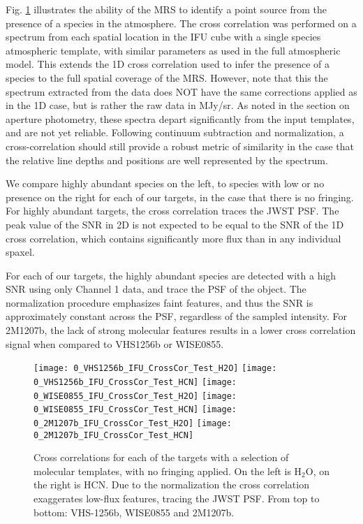 Fig. \ref{fig:2dccmap} illustrates the ability of the MRS to identify a point source from the presence of a species in the atmosphere.
The cross correlation was performed on a spectrum from each spatial location in the IFU cube with a single species atmospheric template, with similar parameters as used in the full atmospheric model.
This extends the 1D cross correlation used to infer the presence of a species to the full spatial coverage of the MRS.
However, note that this the spectrum extracted from the data does NOT have the same corrections applied as in the 1D case, but is rather the raw data in MJy/sr.
As noted in the section on aperture photometry, these spectra depart significantly from the input templates, and are not yet reliable.
Following continuum subtraction and normalization, a cross-correlation should still provide a robust metric of similarity in the case that the relative line depths and positions are well represented by the spectrum.

We compare highly abundant species on the left, to species with low or no presence on the right for each of our targets, in the case that there is no fringing.
For highly abundant targets, the cross correlation traces the JWST PSF.
The peak value of the SNR in 2D is not expected to be equal to the SNR of the 1D cross correlation, which contains significantly more flux than in any individual spaxel.

For each of our targets, the highly abundant species are detected with a high SNR using only Channel 1 data, and trace the PSF of the object.
The normalization procedure emphasizes faint features, and thus the SNR is approximately constant across the PSF, regardless of the sampled intensity.
For 2M1207b, the lack of strong molecular features results in a lower cross correlation signal when compared to VHS1256b or WISE0855.
\begin{figure}[t]
	\centering
	\texttt{[image: 0\_VHS1256b\_IFU\_CrossCor\_Test\_H2O]}
	\texttt{[image: 0\_VHS1256b\_IFU\_CrossCor\_Test\_HCN]}
	\texttt{[image: 0\_WISE0855\_IFU\_CrossCor\_Test\_H2O]}
	\texttt{[image: 0\_WISE0855\_IFU\_CrossCor\_Test\_HCN]}
	\texttt{[image: 0\_2M1207b\_IFU\_CrossCor\_Test\_H2O]}
	\texttt{[image: 0\_2M1207b\_IFU\_CrossCor\_Test\_HCN]}
	\caption{Cross correlations for each of the targets with a selection of molecular templates, with no fringing applied. On the left is H$_{2}$O, on the right is HCN.  Due to the normalization the cross correlation exaggerates low-flux features, tracing the JWST PSF. From top to bottom: VHS-1256b, WISE0855 and 2M1207b.}
	\label{fig:2dccmap}
\end{figure}
